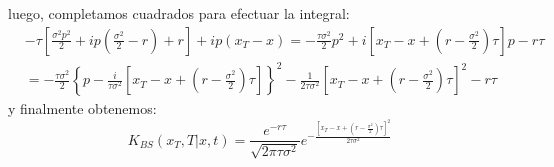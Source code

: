 \documentclass[11pt,a4paper]{article}
\begin{document}
luego, completamos cuadrados para efectuar la integral:
\begin{equation}
\begin{split}
& - \tau \left[ \frac{\sigma^2 p^2}{2}  + ip\left( \frac{\sigma^2 }{2} - r \right) + r \right] + ip(x_T - x) = - \frac{\tau\sigma^2}{2}p^2 + i\left[ x_T - x + \left( r - \frac{\sigma^2}{2} \right)\tau \right]p - r\tau\\
& =  - \frac{\tau\sigma^2}{2}\left\{ p - \frac{i}{\tau\sigma^2}\left[ x_T - x + \left( r - \frac{\sigma^2}{2} \right)\tau \right] \right\}^2 - \frac{1}{2\tau\sigma^2}\left[ x_T - x + \left( r - \frac{\sigma^2}{2} \right)\tau \right]^2 - r\tau
\end{split}
\label{eq:blackscholespropagatorcompletingthesquare}
\end{equation}
y finalmente obtenemos:
\begin{equation}
K_{BS}(x_T,T|x,t) = \frac{e^{-r\tau}}{\sqrt{2\pi\tau\sigma^2}}e^{- \frac{\left[ x_T - x + \left( r - \frac{\sigma^2}{2} \right)\tau \right]^2}{2\tau\sigma^2}}
\label{eq:blackscholespropagator6}
\end{equation}
\end{document}
